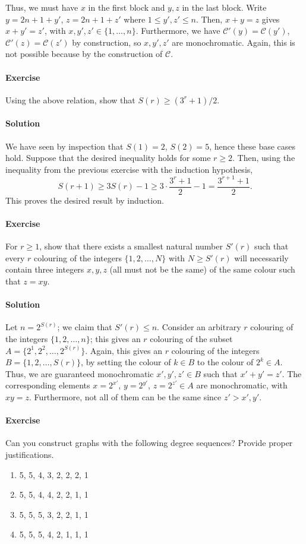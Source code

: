 \documentclass[10pt]{article}
\newcounter{prob}
\newcommand{\problem}{\stepcounter{prob}\paragraph{Exercise \arabic{prob}}}
\newcommand{\solution}{\paragraph{Solution}}
\begin{document}
    Thus, we must have $x$ in the first block and $y, z$ in the last block. Write $y
    = 2n + 1 + y'$, $z = 2n + 1 + z'$ where $1 \leq y', z' \leq n$. Then, $x + y = z$
    gives $x + y' = z'$, with $x, y', z' \in \{1, \dots, n\}$. Furthermore, we have
    $\mathscr{C}'(y) = \mathscr{C}(y')$, $\mathscr{C'}(z) = \mathscr{C}(z')$ by
    construction, so $x, y', z'$ are monochromatic. Again, this is not possible
    because by the construction of $\mathscr{C}$.

    \problem Using the above relation, show that $S(r) \geq (3^r + 1) / 2$.

    \solution We have seen by inspection that $S(1) = 2$, $S(2) = 5$, hence these
    base cases hold. Suppose that the desired inequality holds for some $r \geq 2$.
    Then, using the inequality from the previous exercise with the induction
    hypothesis, \[
        S(r + 1) \geq 3S(r) - 1 \geq 3\cdot \frac{3^r + 1}{2} - 1 = \frac{3^{r + 1} +
        1}{2}.
    \] This proves the desired result by induction.

    \problem For $r \geq 1$, show that there exists a smallest natural number $S'(r)$
    such that every $r$ colouring of the integers $\{1, 2, \dots, N\}$ with $N \geq
    S'(r)$ will necessarily contain three integers $x, y, z$ (all must not be the
    same) of the same colour such that $z = xy$.

    \solution Let $n = 2^{S(r)}$; we claim that $S'(r) \leq n$. Consider an arbitrary
    $r$ colouring of the integers $\{1, 2, \dots, n\}$; this gives an $r$ colouring
    of the subset $A = \{2^1, 2^2, \dots, 2^{S(r)}\}$. Again, this gives an $r$
    colouring of the integers $B = \{1, 2, \dots, S(r)\}$, by setting the colour of
    $k \in B$ to the colour of $2^k \in A$. Thus, we are guaranteed monochromatic
    $x', y', z' \in B$ such that $x' + y' = z'$. The corresponding elements $x =
    2^{x'}$, $y = 2^{y'}$, $z = 2^{z'} \in A$ are monochromatic, with $xy = z$.
    Furthermore, not all of them can be the same since $z' > x', y'$.

    \problem Can you construct graphs with the following degree sequences? Provide
    proper justifications.
    \begin{enumerate}
        \itemsep0em
        \item 5, 5, 4, 3, 2, 2, 2, 1
        \item 5, 5, 4, 4, 2, 2, 1, 1
        \item 5, 5, 5, 3, 2, 2, 1, 1
        \item 5, 5, 5, 4, 2, 1, 1, 1
    \end{enumerate}
\end{document}
